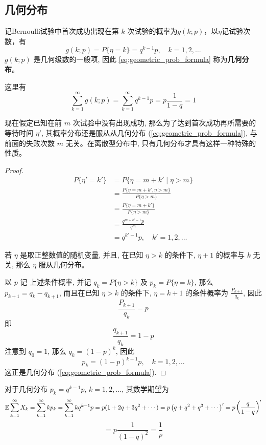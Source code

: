 \subsection{几何分布}\label{subsec:几何分布}
\begin{definition}[几何分布]\label{def:几何分布}
    记Bernoulli试验中首次成功出现在第 $k$ 次试验的概率为$g(k;p)$，以$\eta$记试验次数，有
\begin{equation} \label{eq:geometric_prob_formula}
g(k;p) = P\{\eta = k\} =q^{k-1}p, \quad k=1,2,\ldots
\end{equation}
$g(k;p)$ 是几何级数的一般项, 因此 \eqref{eq:geometric_prob_formula} 称为\textbf{几何分布}。
\end{definition}
\begin{remark}
    这里有
\begin{equation} \label{eq:geometric_sum_to_one}
\sum_{k=1}^\infty g(k;p) = \sum_{k=1}^\infty q^{k-1}p = p \frac{1}{1-q} = 1
\end{equation}
\end{remark}
\begin{proposition}[几何分布的无记忆性]\label{prop:几何分布的无记忆性}
    现在假定已知在前 $m$ 次试验中没有出现成功, 那么为了达到首次成功再所需要的等待时间 $\eta'$, 其概率分布还是服从从几何分布 (\ref{eq:geometric_prob_formula}), 与前面的失败次数 $m$ 无关。在离散型分布中, 只有几何分布才具有这样一种特殊的性质。
    \end{proposition}
\begin{proof}
    \begin{align*}
P\{\eta'=k'\} &= P\{\eta=m+k' \mid \eta>m\} \\
&= \frac{P\{\eta=m+k', \eta>m\}}{P\{\eta>m\}} \\
&= \frac{P\{\eta=m+k'\}}{P\{\eta>m\}} \\
&= \frac{q^{m+k'-1}p}{q^m} \\
&= q^{k'-1}p, \quad k'=1,2,\ldots
\end{align*}

若 $\eta$ 是取正整数值的随机变量, 并且, 在已知 $\eta>k$ 的条件下, $\eta+1$ 的概率与 $k$ 无关, 那么 $\eta$ 服从几何分布。

以 $p$ 记 上述条件概率, 并记 $q_k = P\{\eta>k\}$ 及 $p_k =P\{\eta=k\}$, 那么 $p_{k+1}=q_k-q_{k+1}$, 而且在已知 $\eta>k$ 的条件下, $\eta=k+1$ 的条件概率为 $\frac{P_{k+1}}{q_{k}}$, 因此
\[
\frac{P_{k+1}}{q_{k}} = p
\]
即
\[
\frac{q_{k+1}}{q_k} = 1-p
\]
注意到 $q_0=1$, 那么 $q_k = (1-p)^k$, 因此
\[
p_k = (1-p)^{k-1}p, \quad k=1,2,\ldots
\]
这正是几何分布 (\ref{eq:geometric_prob_formula}).
\end{proof}
\begin{proposition} \label{prop:geometric_expectation}
对于几何分布 $p_k = q^{k-1}p$, $k=1,2,\ldots$, 其数学期望为
\[
\mathbb{E}\sum_{k=1}^\infty X_k = \sum_{k=1}^\infty k p_k = \sum_{k=1}^\infty k q^{k-1}p = p(1 + 2q + 3q^2 + \cdots) = p\left(q + q^2 + q^3 + \cdots\right)' = p\left(\frac{q}{1-q}\right)'
\]
\[
= p \frac{1}{(1-q)^2} = \frac{1}{p}
\]
\end{proposition}

